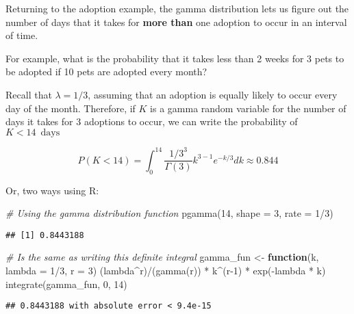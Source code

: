 \documentclass[
]{article}
\newenvironment{Shaded}{\begin{snugshade}}{\end{snugshade}}
\newcommand{\AttributeTok}[1]{\textcolor[rgb]{0.77,0.63,0.00}{#1}}
\newcommand{\CommentTok}[1]{\textcolor[rgb]{0.56,0.35,0.01}{\textit{#1}}}
\newcommand{\ControlFlowTok}[1]{\textcolor[rgb]{0.13,0.29,0.53}{\textbf{#1}}}
\newcommand{\DecValTok}[1]{\textcolor[rgb]{0.00,0.00,0.81}{#1}}
\newcommand{\FunctionTok}[1]{\textcolor[rgb]{0.00,0.00,0.00}{#1}}
\newcommand{\NormalTok}[1]{#1}
\newcommand{\OtherTok}[1]{\textcolor[rgb]{0.56,0.35,0.01}{#1}}
\newcommand{\SpecialCharTok}[1]{\textcolor[rgb]{0.00,0.00,0.00}{#1}}
\begin{document}
Returning to the adoption example, the gamma distribution lets us figure out the number of days that it takes for \textbf{more than} one adoption to occur in an interval of time.

For example, what is the probability that it takes less than 2 weeks for 3 pets to be adopted if 10 pets are adopted every month?

Recall that \(\lambda = 1/3\), assuming that an adoption is equally likely to occur every day of the month. Therefore, if \(K\) is a gamma random variable for the number of days it takes for 3 adoptions to occur, we can write the probability of \(K<14 \enspace \textrm{days}\)

\[ P(K<14) = \int_0^{14} \frac{{1/3}^3}{\Gamma(3)}k^{3-1}e^{-k/3}dk \approx 0.844\]

Or, two ways using R:

\begin{Shaded}
\begin{Highlighting}[]
\CommentTok{\# Using the gamma distribution function}
\FunctionTok{pgamma}\NormalTok{(}\DecValTok{14}\NormalTok{, }\AttributeTok{shape =} \DecValTok{3}\NormalTok{, }\AttributeTok{rate =} \DecValTok{1}\SpecialCharTok{/}\DecValTok{3}\NormalTok{)}
\end{Highlighting}
\end{Shaded}

\begin{verbatim}
## [1] 0.8443188
\end{verbatim}

\begin{Shaded}
\begin{Highlighting}[]
\CommentTok{\# Is the same as writing this definite integral}
\NormalTok{gamma\_fun }\OtherTok{\textless{}{-}} \ControlFlowTok{function}\NormalTok{(k, }\AttributeTok{lambda =} \DecValTok{1}\SpecialCharTok{/}\DecValTok{3}\NormalTok{, }\AttributeTok{r =} \DecValTok{3}\NormalTok{) (lambda}\SpecialCharTok{\^{}}\NormalTok{r)}\SpecialCharTok{/}\NormalTok{(}\FunctionTok{gamma}\NormalTok{(r)) }\SpecialCharTok{*}\NormalTok{ k}\SpecialCharTok{\^{}}\NormalTok{(r}\DecValTok{{-}1}\NormalTok{) }\SpecialCharTok{*} \FunctionTok{exp}\NormalTok{(}\SpecialCharTok{{-}}\NormalTok{lambda }\SpecialCharTok{*}\NormalTok{ k)}
\FunctionTok{integrate}\NormalTok{(gamma\_fun, }\DecValTok{0}\NormalTok{, }\DecValTok{14}\NormalTok{)}
\end{Highlighting}
\end{Shaded}

\begin{verbatim}
## 0.8443188 with absolute error < 9.4e-15
\end{verbatim}
\end{document}
